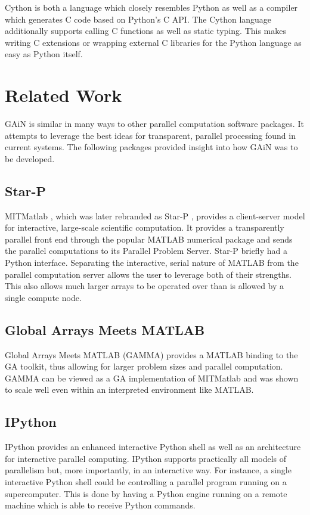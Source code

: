 \documentclass{sigplanconf}
\begin{document}
Cython \cite{Beh11} is both a language which closely resembles Python as well
as a compiler which generates C code based on Python's C API. The Cython
language additionally supports calling C functions as well as static typing.
This makes writing C extensions or wrapping external C libraries for the
Python language as easy as Python itself.

\section{Related Work}

GAiN is similar in many ways to other parallel computation software packages.
It attempts to leverage the best ideas for transparent, parallel processing
found in current systems. The following packages provided insight into how
GAiN was to be developed.

\subsection{Star-P}

MITMatlab \cite{Hus98}, which was later rebranded as Star-P \cite{Ede07},
provides a client-server model for interactive, large-scale scientific
computation. It provides a transparently parallel front end through the
popular MATLAB \cite{Pal07} numerical package and sends the parallel
computations to its Parallel Problem Server. Star-P briefly had a Python
interface. Separating the interactive, serial nature of MATLAB from the
parallel computation server allows the user to leverage both of their
strengths. This also allows much larger arrays to be operated over than is
allowed by a single compute node.

\subsection{Global Arrays Meets MATLAB}

Global Arrays Meets MATLAB (GAMMA) \cite{Pan06} provides a MATLAB binding to
the GA toolkit, thus allowing for larger problem sizes and parallel
computation.  GAMMA can be viewed as a GA implementation of MITMatlab and was
shown to scale well even within an interpreted environment like MATLAB.

\subsection{IPython}

IPython \cite{Per07} provides an enhanced interactive Python shell as well as
an architecture for interactive parallel computing. IPython supports
practically all models of parallelism but, more importantly, in an interactive
way. For instance, a single interactive Python shell could be controlling a
parallel program running on a supercomputer. This is done by having a Python
engine running on a remote machine which is able to receive Python commands.
\end{document}
